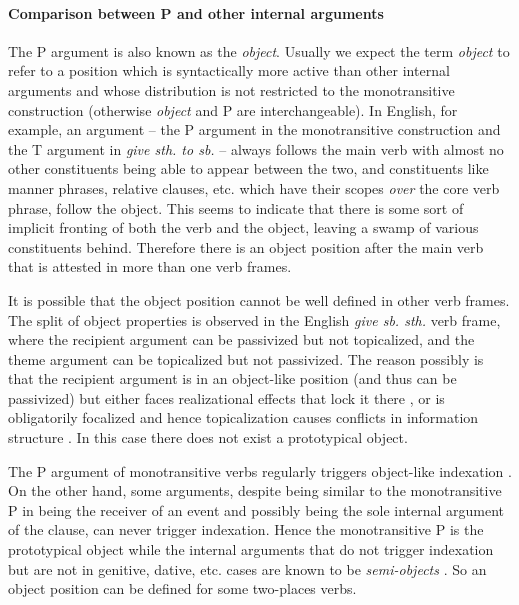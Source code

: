 \documentclass[a4paper, oneside, 12pt]{report}
\newcommand*{\citesec}[1]{\S~{#1}}
\newcommand*{\citepage}[1]{p.~{#1}}
\newcommand*{\term}[1]{\emph{#1}}
\newcommand{\form}[1]{\emph{#1}}
\begin{document}
\paragraph*{Comparison between P and other internal arguments}
\label{sec:grammatical.clause.internal.object}
The P argument is also known as the \term{object}.
Usually we expect the term \term{object} to refer to a position 
which is syntactically more active than other internal arguments
and whose distribution is not restricted to the monotransitive construction
(otherwise \term{object} and P are interchangeable).
In English, for example,
an argument -- the P argument in the monotransitive construction 
and the T argument in \form{give sth. to sb.} --
always follows the main verb with almost no other constituents
being able to appear between the two,
and constituents like manner phrases, relative clauses, etc.
which have their scopes \emph{over} the core verb phrase, follow the object.
This seems to indicate that there is some sort of implicit fronting 
of both the verb and the object,
leaving a swamp of various constituents behind.
Therefore there is an object position after the main verb
that is attested in more than one verb frames. 

It is possible that the object position cannot be well defined in other verb frames. 
The split of object properties is observed in the English \form{give sb. sth.} verb frame,
where the recipient argument can be passivized but not topicalized,
and the theme argument can be topicalized but not passivized.
The reason possibly is that the recipient argument is in an object-like position
(and thus can be passivized)
but either faces realizational effects that lock it there 
\citep{oba2005double},
or is obligatorily focalized and hence topicalization causes conflicts in information structure
\citep{im2005alternative}.
In this case there does not exist a prototypical object.

The P argument of monotransitive verbs regularly triggers object-like indexation
\citep[\citesec{8.1.3}, \citepage{543}]{jacques2021grammar}.
On the other hand, some arguments, 
despite being similar to the monotransitive P in being the receiver of an event 
and possibly being the sole internal argument of the clause,
can never trigger indexation.
Hence the monotransitive P is the prototypical object
while the internal arguments that do not trigger indexation 
but are not in genitive, dative, etc. cases
are known to be \term{semi-objects}
\citep[\citesec{8.1.5}]{jacques2021grammar}.
So an object position can be defined for some two-places verbs.
\end{document}
